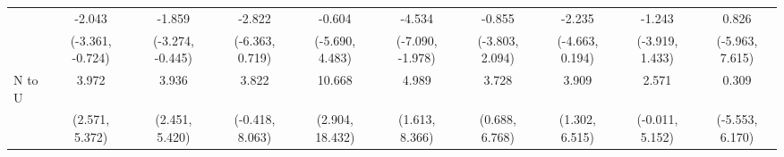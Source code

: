 {\begin{tabular}{l|c|c|c|c|c|c|c|c|c}
& -2.043 & -1.859 & -2.822 & -0.604 & -4.534 & -0.855 & -2.235 & -1.243 & 0.826 \\
& {\scriptsize (-3.361, -0.724)}
& {\scriptsize (-3.274, -0.445)}
& {\scriptsize (-6.363, 0.719)}
& {\scriptsize (-5.690, 4.483)}
& {\scriptsize (-7.090, -1.978)}
& {\scriptsize (-3.803, 2.094)}
& {\scriptsize (-4.663, 0.194)}
& {\scriptsize (-3.919, 1.433)}
& {\scriptsize (-5.963, 7.615)}
\\ [0.1cm]
\hline
N to U
& 3.972 & 3.936 & 3.822 & 10.668 & 4.989 & 3.728 & 3.909 & 2.571 & 0.309 \\
& {\scriptsize (2.571, 5.372)}
& {\scriptsize (2.451, 5.420)}
& {\scriptsize (-0.418, 8.063)}
& {\scriptsize (2.904, 18.432)}
& {\scriptsize (1.613, 8.366)}
& {\scriptsize (0.688, 6.768)}
& {\scriptsize (1.302, 6.515)}
& {\scriptsize (-0.011, 5.152)}
& {\scriptsize (-5.553, 6.170)}
\\ [0.1cm]
\hline
\hline
\end{tabular}
}
